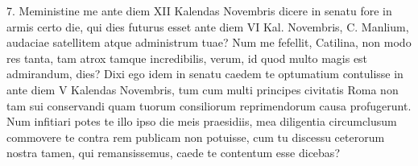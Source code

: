 {  %
  7. Meministine me ante diem XII Kalendas Novembris dicere in senatu fore in armis certo die, qui dies futurus esset ante diem VI Kal. Novembris, C. Manlium, audaciae satellitem atque administrum tuae? Num me fefellit, Catilina, non modo res tanta, tam atrox tamque incredibilis, verum, id quod multo magis est admirandum, dies? Dixi ego idem in senatu caedem te optumatium contulisse in ante diem V Kalendas Novembris, tum cum multi principes civitatis Roma non tam sui conservandi quam tuorum consiliorum reprimendorum causa profugerunt. Num infitiari potes te illo ipso die meis praesidiis, mea diligentia circumclusum commovere te contra rem publicam non potuisse, cum tu discessu ceterorum nostra tamen, qui remansissemus, caede te contentum esse dicebas?

}
